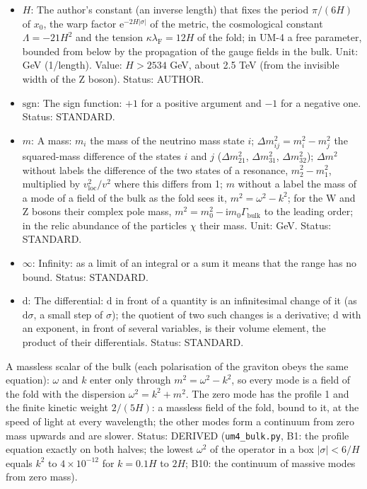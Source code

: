 \documentclass[
  10pt,
]{article}
\begin{document}
\begin{itemize}
  respect to \(x_4\) (\(a_4' = \mathrm{d}a_4/\mathrm{d}x_4\); two primes
  the second derivative); on a function of \(\sigma\) alone (a profile)
  the derivative with respect to \(\sigma\). Status: STANDARD.
\item
  \(H\): The author's constant (an inverse length) that fixes the period
  \(\pi/(6H)\) of \(x_0\), the warp factor
  \(\mathrm{e}^{-2H\lvert\sigma\rvert}\) of the metric, the cosmological
  constant \(\Lambda = -21H^2\) and the tension
  \(\kappa\lambda_{\mathrm{F}} = 12H\) of the fold; in UM-4 a free
  parameter, bounded from below by the propagation of the gauge fields
  in the bulk. Unit: GeV (1/length). Value: \(H > 2534\) GeV, about 2.5
  TeV (from the invisible width of the Z boson). Status: AUTHOR.
\item
  \(\mathrm{sgn}\): The sign function: \(+1\) for a positive argument
  and \(-1\) for a negative one. Status: STANDARD.
\item
  \(m\): A mass: \(m_i\) the mass of the neutrino mass state \(i\);
  \(\Delta m_{ij}^2 = m_i^2 - m_j^2\) the squared-mass difference of the
  states \(i\) and \(j\) (\(\Delta m_{21}^2\), \(\Delta m_{31}^2\),
  \(\Delta m_{32}^2\)); \(\Delta m^2\) without labels the difference of
  the two states of a resonance, \(m_2^2 - m_1^2\), multiplied by
  \(v_{\mathrm{loc}}^2/v^2\) where this differs from 1; \(m\) without a
  label the mass of a mode of a field of the bulk as the fold sees it,
  \(m^2 = \omega^2 - k^2\); for the W and Z bosons their complex pole
  mass, \(m^2 = m_0^2 - \mathrm{i}m_0\Gamma_{\mathrm{bulk}}\) to the
  leading order; in the relic abundance of the particles \(\chi\) their
  mass. Unit: GeV. Status: STANDARD.
\item
  \(\infty\): Infinity: as a limit of an integral or a sum it means that
  the range has no bound. Status: STANDARD.
\item
  \(\mathrm{d}\): The differential: \(\mathrm{d}\) in front of a
  quantity is an infinitesimal change of it (as \(\mathrm{d}\sigma\), a
  small step of \(\sigma\)); the quotient of two such changes is a
  derivative; \(\mathrm{d}\) with an exponent, in front of several
  variables, is their volume element, the product of their
  differentials. Status: STANDARD.
\end{itemize}

A massless scalar of the bulk (each polarisation of the graviton obeys
the same equation): \(\omega\) and \(k\) enter only through
\(m^2 = \omega^2 - k^2\), so every mode is a field of the fold with the
dispersion \(\omega^2 = k^2 + m^2\). The zero mode has the profile 1 and
the finite kinetic weight \(2/(5H)\): a massless field of the fold,
bound to it, at the speed of light at every wavelength; the other modes
form a continuum from zero mass upwards and are slower. Status: DERIVED
(\texttt{um4\_bulk.py}, B1: the profile equation exactly on both halves;
the lowest \(\omega^2\) of the operator in a box
\(\lvert\sigma\rvert < 6/H\) equals \(k^2\) to \(4\times10^{-12}\) for
\(k = 0.1H\) to \(2H\); B10: the continuum of massive modes from zero
mass).
\end{document}
